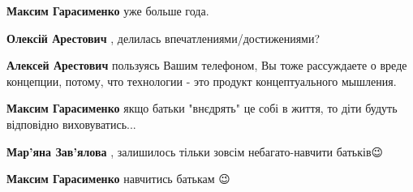 \begin{itemize}
\begin{itemize}
 
\textbf{Максим Гарасименко} уже больше года.

 
\textbf{Олексій Арестович} , делилась впечатлениями/достижениями?

 
\textbf{Алексей Арестович} пользуясь Вашим телефоном, Вы тоже рассуждаете о вреде концепции, потому, что технологии - это продукт концептуального мышления.

 
\textbf{Максим Гарасименко} якщо батьки "внєдрять" це собі в життя, то діти будуть відповідно виховуватись...

 
\textbf{Мар'яна Зав'ялова} , залишилось тільки зовсім небагато-навчити батьків😉

 
\textbf{Максим Гарасименко} навчитись батькам 😉

 

\end{itemize}
\end{itemize}
